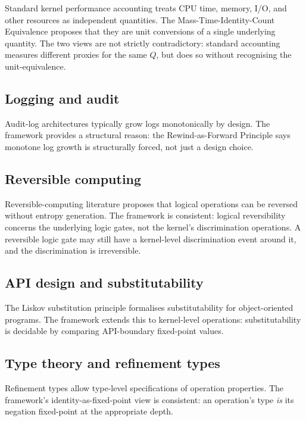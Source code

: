 \documentclass[twocolumn,11pt,a4paper]{article}
\newcommand{\Qweight}{Q}
\begin{document}
Standard kernel performance accounting \citep{jain1991art, gregg2013systems} treats CPU time, memory, I/O, and other resources as independent quantities. The Mass-Time-Identity-Count Equivalence proposes that they are unit conversions of a single underlying quantity. The two views are not strictly contradictory: standard accounting measures different proxies for the same $\Qweight$, but does so without recognising the unit-equivalence.

\subsection{Logging and audit}

Audit-log architectures \citep{schneier1999secure, ma2017hercule} typically grow logs monotonically by design. The framework provides a structural reason: the Rewind-as-Forward Principle says monotone log growth is structurally forced, not just a design choice.

\subsection{Reversible computing}

Reversible-computing literature \citep{bennett1973logical, bennett1982} proposes that logical operations can be reversed without entropy generation. The framework is consistent: logical reversibility concerns the underlying logic gates, not the kernel's discrimination operations. A reversible logic gate may still have a kernel-level discrimination event around it, and the discrimination is irreversible.

\subsection{API design and substitutability}

The Liskov substitution principle \citep{liskov1987data} formalises substitutability for object-oriented programs. The framework extends this to kernel-level operations: substitutability is decidable by comparing API-boundary fixed-point values.

\subsection{Type theory and refinement types}

Refinement types \citep{rondon2008liquid, vazou2014refinement} allow type-level specifications of operation properties. The framework's identity-as-fixed-point view is consistent: an operation's type \emph{is} its negation fixed-point at the appropriate depth.
\end{document}
